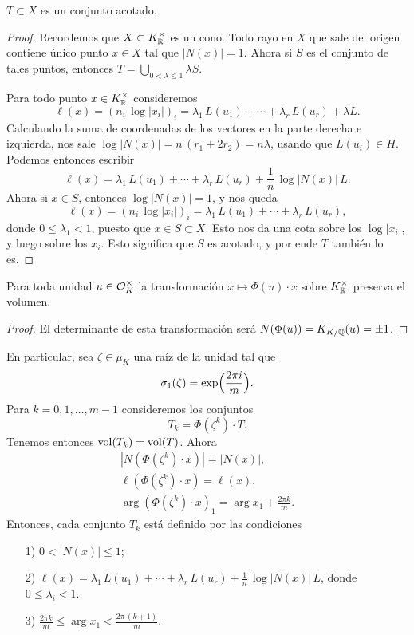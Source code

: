 \begin{lema}
  $T \subset X$ es un conjunto acotado.

  \begin{proof}
    Recordemos que $X \subset K_{\mathbb{R}}^\times$ es un cono. Todo rayo en $X$ que
    sale del origen contiene único punto $x\in X$ tal que $|N (x)| = 1$.
    Ahora si $S$ es el conjunto de tales puntos, entonces
    $T = \bigcup_{0 < \lambda \le 1} \lambda S$.

    Para todo punto $x \in K_{\mathbb{R}}^\times$ consideremos
    \[ \ell (x) = (n_i\,\log |x_i|)_i =
       \lambda_1 \, L (u_1) + \cdots + \lambda_r \, L (u_r) + \lambda L. \]
    Calculando la suma de coordenadas de los vectores en la parte derecha
    e izquierda, nos sale
    $\log |N (x)| = n\,(r_1 + 2r_2) = n\lambda$,
    usando que $L (u_i) \in H$.
    Podemos entonces escribir
    \[ \ell (x) =
       \lambda_1 \, L (u_1) + \cdots + \lambda_r \, L (u_r) +
       \frac{1}{n}\,\log |N (x)|\,L. \]
    Ahora si $x \in S$, entonces $\log |N (x)| = 1$, y nos queda
    \[ \ell (x) = (n_i\,\log |x_i|)_i
       = \lambda_1 \, L (u_1) + \cdots + \lambda_r \, L (u_r), \]
    donde $0 \le \lambda_1 < 1$, puesto que $x \in S \subset X$. Esto nos
    da una cota sobre los $\log |x_i|$, y luego sobre los $x_i$. Esto significa
    que $S$ es acotado, y por ende $T$ también lo es.
  \end{proof}
\end{lema}

\begin{lema}
  Para toda unidad $u \in \mathcal{O}_K^\times$ la transformación
  $x \mapsto \Phi (u)\cdot x$ sobre $K_{\mathbb{R}}^\times$ preserva el volumen.

  \begin{proof}
    El determinante de esta transformación será
    $N (\Phi (u)) = K_{K/\mathbb{Q}} (u) = \pm 1$.
  \end{proof}
\end{lema}

En particular, sea $\zeta \in \mu_K$ una raíz de la unidad tal que
$$\sigma_1 (\zeta) = \exp \Bigl(\frac{2\pi i}{m}\Bigr).$$
Para $k = 0,1,\ldots,m-1$ consideremos los conjuntos
$$T_k = \Phi (\zeta^k)\cdot T.$$
Tenemos entonces $\operatorname{vol} (T_k) = \operatorname{vol} (T)$. Ahora
\begin{gather*}
  |N (\Phi (\zeta^k)\cdot x)| = |N (x)|,\\
  \ell (\Phi (\zeta^k)\cdot x) = \ell (x),\\
  \arg (\Phi (\zeta^k)\cdot x)_1 = \arg x_1 + \frac{2\pi k}{m}.
\end{gather*}
Entonces, cada conjunto $T_k$ está definido por las condiciones
\begin{enumerate}
\item[1)] $0 < |N (x)| \le 1$;

\item[2)] $\ell (x) = \lambda_1 \, L (u_1) + \cdots + \lambda_r \, L (u_r) + \frac{1}{n}\,\log |N (x)|\,L$,
  donde $0 \le \lambda_i < 1$.

\item[3)] $\frac{2\pi k}{m} \le \arg x_1 < \frac{2\pi\,(k+1)}{m}$.
\end{enumerate}

